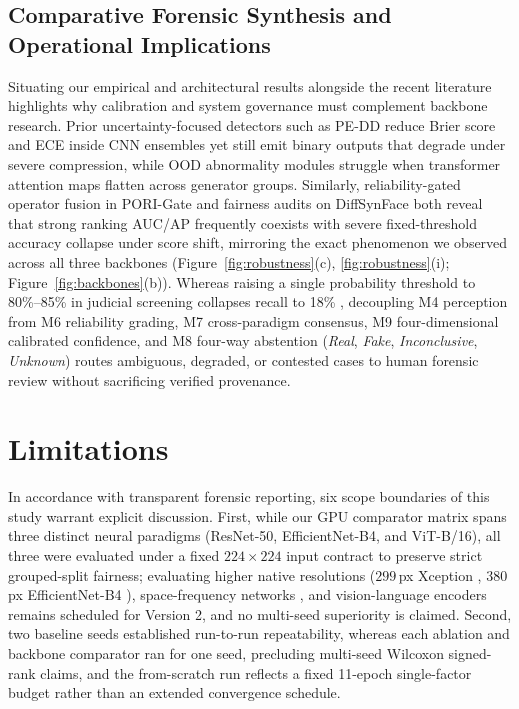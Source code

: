 \documentclass[final,5p,times,twocolumn,numafflabel]{elsarticle}
\begin{document}
\subsection{Comparative Forensic Synthesis and Operational Implications}
\label{subsec:synthesis}

Situating our empirical and architectural results alongside the recent literature highlights why calibration and system governance must complement backbone research. Prior uncertainty-focused detectors such as PE-DD \cite{Jin_2025} reduce Brier score and ECE inside CNN ensembles yet still emit binary outputs that degrade under severe compression, while OOD abnormality modules \cite{Maiano_2026} struggle when transformer attention maps flatten across generator groups. Similarly, reliability-gated operator fusion in PORI-Gate \cite{Shen_2026} and fairness audits on DiffSynFace \cite{Panda_2026} both reveal that strong ranking AUC/AP frequently coexists with severe fixed-threshold accuracy collapse under score shift, mirroring the exact phenomenon we observed across all three backbones (Figure~\ref{fig:robustness}(c), \ref{fig:robustness}(i); Figure~\ref{fig:backbones}(b)). Whereas raising a single probability threshold to 80\%--85\% in judicial screening collapses recall to 18\% \cite{Hydara_2024}, decoupling M4 perception from M6 reliability grading, M7 cross-paradigm consensus, M9 four-dimensional calibrated confidence, and M8 four-way abstention (\textit{Real}, \textit{Fake}, \textit{Inconclusive}, \textit{Unknown}) routes ambiguous, degraded, or contested cases to human forensic review \cite{Silva_2022} without sacrificing verified provenance.

\section{Limitations}
\label{sec:limitations}

In accordance with transparent forensic reporting, six scope boundaries of this study warrant explicit discussion. First, while our GPU comparator matrix spans three distinct neural paradigms (ResNet-50, EfficientNet-B4, and ViT-B/16), all three were evaluated under a fixed $224\times 224$ input contract to preserve strict grouped-split fairness; evaluating higher native resolutions ($299$\,px Xception \cite{Altamimi_2026}, $380$\,px EfficientNet-B4 \cite{Silva_2022}), space-frequency networks \cite{Guo_2024}, and vision-language encoders \cite{Wu_2026} remains scheduled for Version 2, and no multi-seed superiority is claimed. Second, two baseline seeds established run-to-run repeatability, whereas each ablation and backbone comparator ran for one seed, precluding multi-seed Wilcoxon signed-rank claims, and the from-scratch run reflects a fixed 11-epoch single-factor budget rather than an extended convergence schedule.
\end{document}
